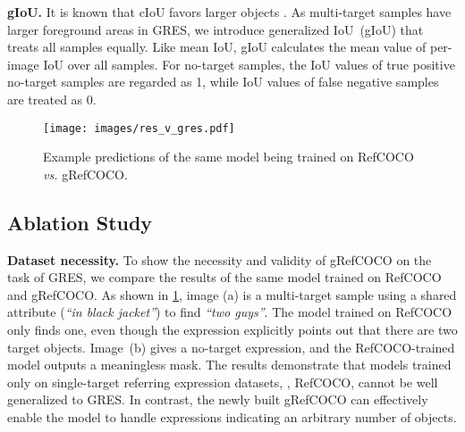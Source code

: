 \documentclass[10pt,twocolumn,letterpaper]{article}
\let\oldsubsection\subsection
\renewcommand{\subsection}[1]{\oldsubsection{#1} }
\begin{document}
\textbf{gIoU.} It is known that cIoU favors larger objects \cite{yang2021lavt,wu2020phrasecut}. As multi-target samples have larger foreground areas in GRES, we introduce generalized IoU~(gIoU) that treats all samples equally. Like mean IoU, gIoU calculates the mean value of per-image IoU over all samples. For no-target samples, 
the IoU values of true positive no-target samples are regarded as 1, while IoU values of false negative samples are treated as 0.


\begin{figure}[t]
  \begin{center}
     \texttt{[image: images/res\_v\_gres.pdf]}
  \end{center}
  \vspace{-0.24in}
  \caption{Example predictions of the same model being trained on RefCOCO \textit{vs.} gRefCOCO.}
  \label{fig:gres_v_res}
 \vspace{-0.05in}
\end{figure}




\subsection{Ablation Study}

\textbf{Dataset necessity.} To show the necessity and validity of gRefCOCO on the task of GRES, we compare the results of the same model trained on RefCOCO and gRefCOCO. As shown in \cref{fig:gres_v_res}, image (a) is a multi-target sample using a shared attribute (\textit{``in black jacket''}) to find \textit{``two guys''}. 
The model trained on RefCOCO only finds one, even though the expression explicitly points out that there are two target objects. Image~(b) gives a no-target expression, and the RefCOCO-trained model outputs a meaningless mask. The results demonstrate that models trained only on single-target referring expression datasets, \eg, RefCOCO, cannot be well generalized to GRES. 
In contrast, the newly built gRefCOCO can effectively enable the model to handle expressions indicating an arbitrary number of objects.
\end{document}

